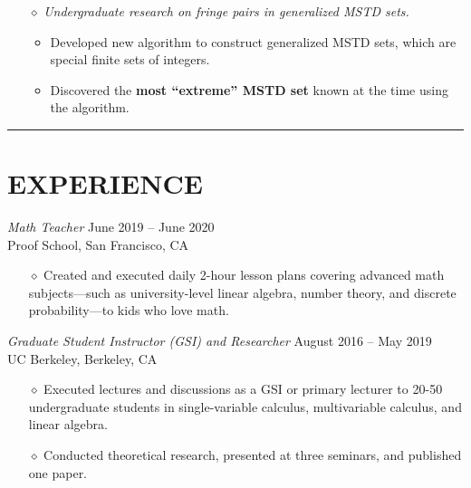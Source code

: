 \documentclass{simplecv}
\begin{document}
\begin{itemize}
\begin{itemize}
  \end{itemize}
  \item[$\diamond$] {\it Undergraduate research on fringe pairs in generalized MSTD sets.} 
  \begin{itemize}
    \item Developed new algorithm to construct generalized MSTD sets, which are special finite sets of integers. 
    \item Discovered the {\bf most ``extreme'' MSTD set} known at the time using the algorithm.
  \end{itemize}
\end{itemize}

\rule{10cm}{0.5pt}

\vspace{-0.4cm}

\section{EXPERIENCE}
{\sl Math Teacher} \hfill June 2019 -- June 2020 \\
Proof School, San Francisco, CA
\begin{itemize}
  \item[$\diamond$] Created and executed daily 2-hour lesson plans covering advanced math subjects---such as university-level linear algebra, number theory, and discrete probability---to kids who love math.
\end{itemize}
{\sl Graduate Student Instructor (GSI) and Researcher} \hfill August 2016 -- May 2019 \\
UC Berkeley, Berkeley, CA
\begin{itemize}
  \item[$\diamond$] Executed lectures and discussions as a GSI or primary lecturer to 20-50 undergraduate students in single-variable calculus, multivariable calculus, and linear algebra.
  \item[$\diamond$] Conducted theoretical research, presented at three seminars, and published one paper.
\end{itemize}
\end{document}
